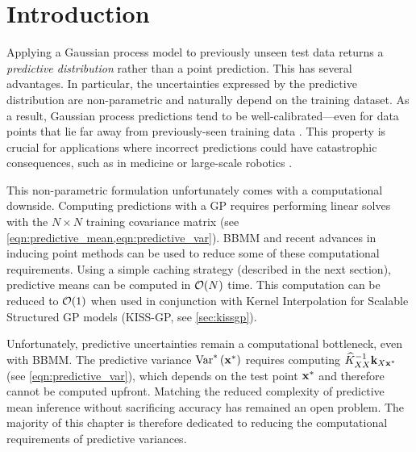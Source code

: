\section{Introduction}
Applying a Gaussian process model to previously unseen test data returns a \emph{predictive distribution} rather than a point prediction.
This has several advantages.
In particular, the uncertainties expressed by the predictive distribution are non-parametric and naturally depend on the training dataset.
As a result, Gaussian process predictions tend to be well-calibrated---even for data points that lie far away from previously-seen training data \cite{rasmussen2001occam,wilson2014thesis}.
This property is crucial for applications where incorrect predictions could have catastrophic consequences, such as in medicine \cite{schulam2017if} or large-scale robotics \cite{deisenroth2015gaussian}.

This non-parametric formulation unfortunately comes with a computational downside.
Computing predictions with a GP requires performing linear solves with the $N \times N$ training covariance matrix (see \cref{eqn:predictive_mean,eqn:predictive_var}).
BBMM and recent advances in {inducing point methods} can be used to reduce some of these computational requirements.
Using a simple caching strategy (described in the next section), predictive means can be computed in $\bigo{N}$ time.
This computation can be reduced to $\bigo{1}$ when used in conjunction with Kernel Interpolation for Scalable Structured GP models (KISS-GP, see \cref{sec:kissgp}).

Unfortunately, predictive uncertainties remain a computational bottleneck, even with BBMM.
The predictive variance $\text{Var}^* \left( \mathbf{x}^* \right)$ requires computing $\widehat{K}_{XX}^{-1} \mathbf{k}_{X\mathbf{x}^*}$ (see \cref{eqn:predictive_var}), which depends on the test point $\mathbf{x}^*$ and therefore cannot be computed upfront.
Matching the reduced complexity of predictive mean inference without sacrificing accuracy has remained an open problem.
The majority of this chapter is therefore dedicated to reducing the computational requirements of predictive variances.

